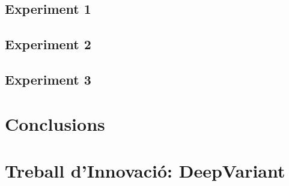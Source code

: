 \documentclass[a4paper]{article}
\begin{document}
	\subsection{Experiment 1}
	
	\subsection{Experiment 2}
	
	\subsection{Experiment 3}
	
	\newpage
	\section{Conclusions}
	
	
	\newpage
	\section{Treball d'Innovació: DeepVariant}
	
	
	
\end{document}
